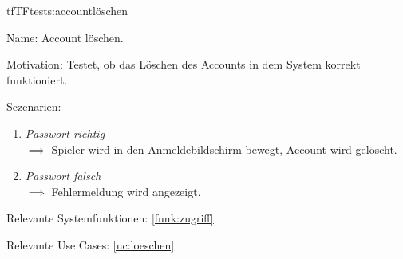 \begin{description}[leftmargin=5em, style=sameline]

\begin{lhp}{tf}{TF}{tests:accountlöschen}
	\item [Name:] Account löschen.
	\item [Motivation:] Testet, ob das Löschen des Accounts in dem System korrekt funktioniert.
	\item [Sczenarien:] \hfill
		\begin{enumerate}
			\item \textit{Passwort richtig} \\ $\implies$ Spieler wird in den Anmeldebildschirm bewegt, Account wird gelöscht.
			\item \textit{Passwort falsch} \\ $\implies$ Fehlermeldung wird angezeigt.
	
		\end{enumerate}
	\item [Relevante Systemfunktionen:] \ref{funk:zugriff}
	\item [Relevante Use Cases:] \ref{uc:loeschen}
\end{lhp}

\end{description}

